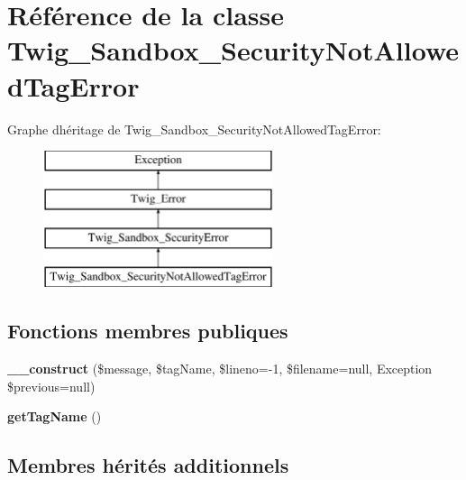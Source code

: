\hypertarget{class_twig___sandbox___security_not_allowed_tag_error}{}\section{Référence de la classe Twig\+\_\+\+Sandbox\+\_\+\+Security\+Not\+Allowed\+Tag\+Error}
\label{class_twig___sandbox___security_not_allowed_tag_error}
Graphe d\textquotesingle{}héritage de Twig\+\_\+\+Sandbox\+\_\+\+Security\+Not\+Allowed\+Tag\+Error\+:\begin{figure}[H]
\begin{center}
\leavevmode
\includegraphics[height=4.000000cm]{class_twig___sandbox___security_not_allowed_tag_error}
\end{center}
\end{figure}
\subsection*{Fonctions membres publiques}
\begin{DoxyCompactItemize}
\item 
{\bfseries \+\_\+\+\_\+construct} (\$message, \$tag\+Name, \$lineno=-\/1, \$filename=null, Exception \$previous=null)\hypertarget{class_twig___sandbox___security_not_allowed_tag_error_a40d87ba738afb9f0c4bdd0e740cdd68d}{}\label{class_twig___sandbox___security_not_allowed_tag_error_a40d87ba738afb9f0c4bdd0e740cdd68d}

\item 
{\bfseries get\+Tag\+Name} ()\hypertarget{class_twig___sandbox___security_not_allowed_tag_error_a2a21085426efb4a6c3d9ed4db9f8524c}{}\label{class_twig___sandbox___security_not_allowed_tag_error_a2a21085426efb4a6c3d9ed4db9f8524c}

\end{DoxyCompactItemize}
\subsection*{Membres hérités additionnels}


